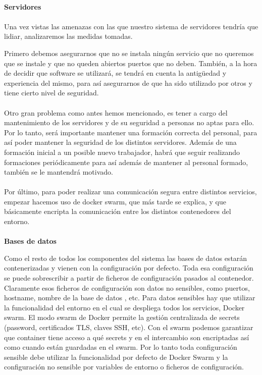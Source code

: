 \paragraph{}
\textbf{Servidores}
\paragraph{}
Una vez vistas las amenazas con las que nuestro sistema de servidores
tendría que lidiar, analizaremos las medidas tomadas.

Primero debemos asegurarnos que no se instala ningún servicio que no
queremos que se instale y que no queden abiertos puertos que no
deben. También, a la hora de decidir que software se utilizará, se
tendrá en cuenta la antigüedad y experiencia del mismo, para así
asegurarnos de que ha sido utilizado por otros y tiene cierto nivel de
seguridad.
\paragraph{}
Otro gran problema como antes hemos mencionado, es tener a cargo del
mantenimiento de los servidores y de su seguridad a personas no aptas
para ello. Por lo tanto, será importante mantener una formación
correcta del personal, para así poder mantener la seguridad de los
distintos servidores. Además de una formación inicial a un posible
nuevo trabajador, habrá que seguir realizando formaciones
periódicamente para así además de mantener al personal formado,
también se le mantendrá motivado.
\paragraph{}
Por último, para poder realizar una comunicación segura entre
distintos servicios, empezar hacemos uso de docker swarm, que más
tarde se explica, y que básicamente encripta la comunicación entre los
distintos contenedores del entorno.
\paragraph{}
\textbf{Bases de datos}

Como el resto de todos los componentes del sistema las bases de datos
estarán contenerizadas y vienen con la configuración por defecto. Toda
esa configuración se puede sobrescribir a partir de ficheros de
configuración pasados al contenedor. Claramente esos ficheros de
configuración son datos no sensibles, como puertos, hostname, nombre
de la base de datos , etc. Para datos sensibles hay que utilizar la
funcionalidad del entorno en el cual se despliega todos los servicios,
Docker swarm. El modo swarm de Docker permite la gestión centralizada
de secrets (password, certificados TLS, claves SSH, etc). Con el swarm
podemos garantizar que container tiene acceso a qué secrets y en el
intercambio son encriptadas así como cuando están guardadas en el
swarm. Por lo tanto toda configuración sensible debe utilizar la
funcionalidad por defecto de Docker Swarm y la configuración no
sensible por variables de entorno o ficheros de configuración.
